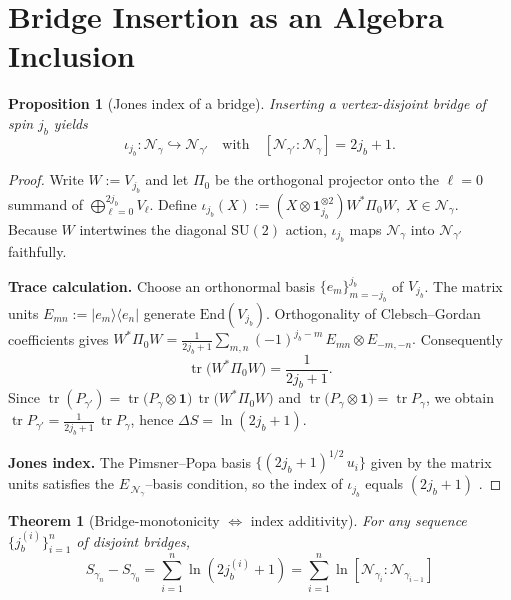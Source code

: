 \documentclass[11pt]{article}
\newtheorem{theorem}{Theorem}[section]
\newtheorem{proposition}{Proposition}[section]
\begin{document}
\section{Bridge Insertion as an Algebra Inclusion}

\begin{proposition}[Jones index of a bridge]
Inserting a vertex-disjoint bridge of spin $j_b$ yields
\[
  \iota_{j_b}:\mathcal N_{\gamma}\hookrightarrow \mathcal N_{\gamma'}
\quad\text{with}\quad
  [\mathcal N_{\gamma'}:\mathcal N_{\gamma}] = 2j_b+1.
\]
\end{proposition}

\begin{proof}
Write $W:=V_{j_b}$ and let $\Pi_0$ be the orthogonal projector onto the
$\ell=0$ summand of $\bigoplus_{\ell=0}^{2j_b}V_{\ell}$.  Define
\(
  \iota_{j_b}(X):=
  (X\otimes\mathbf 1_{j_b}^{\otimes2})W^{*}\Pi_0 W,
  \;X\in\mathcal N_{\gamma}.
\)
Because $W$ intertwines the diagonal $\mathrm{SU}(2)$ action,
$\iota_{j_b}$ maps $\mathcal N_{\gamma}$ into
$\mathcal N_{\gamma'}$ faithfully.

\medskip
\noindent\textbf{Trace calculation.}  Choose an orthonormal basis
$\{e_m\}_{m=-j_b}^{j_b}$ of $V_{j_b}$.
The matrix units
$E_{mn} := |e_m\rangle\langle e_n|$ generate
$\mathrm{End}(V_{j_b})$.
Orthogonality of Clebsch–Gordan coefficients gives
\(
  W^{*}\Pi_0 W
  =
  \frac{1}{2j_b+1}
  \sum_{m,n} (-1)^{j_b-m}\, E_{mn}\otimes E_{-m,-n}.
\)
Consequently
\[
  \operatorname{tr}\bigl(W^{*}\Pi_0 W\bigr)=\frac{1}{2j_b+1}.
\]
Since $\operatorname{tr}(P_{\gamma'})=
\operatorname{tr}\bigl(P_{\gamma}\otimes\mathbf1\bigr)\,
\operatorname{tr}\bigl(W^{*}\Pi_0 W\bigr)$
and $\operatorname{tr}\bigl(P_{\gamma}\otimes\mathbf1\bigr)
      = \operatorname{tr}P_{\gamma}$,
we obtain
$\operatorname{tr}P_{\gamma'} = \tfrac{1}{2j_b+1}\,\operatorname{tr}P_{\gamma}$,
hence $\Delta S=\ln(2j_b+1)$.

\medskip
\noindent\textbf{Jones index.}  
The Pimsner–Popa basis $\{(2j_b+1)^{1/2}\,u_i\}$ given by the matrix units
satisfies the \(E_{\,\mathcal N_\gamma}\)–basis condition, so the index of
$\iota_{j_b}$ equals $(2j_b+1)$ \cite[Thm.~2.1]{PopaCBMS}.
\end{proof}

\begin{theorem}[Bridge-monotonicity $\Leftrightarrow$ index additivity]
For any sequence $\{j_b^{(i)}\}_{i=1}^{n}$ of disjoint bridges,
\[
  S_{\gamma_n}-S_{\gamma_0}
  =\sum_{i=1}^{n}\ln\!(2j_b^{(i)}+1)
  =\sum_{i=1}^{n}\ln[\mathcal N_{\gamma_i}:\mathcal N_{\gamma_{i-1}}]
  \tag{\thetheorem}\label{eq:additivity}
\]
\end{theorem}
\end{document}
